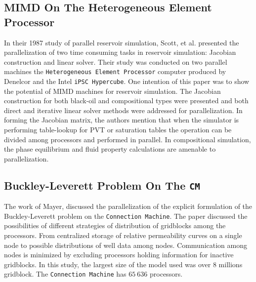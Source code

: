 \documentclass[barcolor=BrickRed,nocopyright,nolists]{asmejour}
\begin{document}
\subsection{MIMD On The Heterogeneous Element Processor}
In their 1987 study of parallel reservoir simulation, Scott, et al.\cite{spe16020} presented the parallelization of two time consuming tasks in reservoir simulation: Jacobian construction and linear solver.
Their study was conducted on two parallel machines the \texttt{Heterogeneous Element Processor} computer produced by Denelcor and the Intel \texttt{iPSC Hypercube}. One intention of this paper was to show
the potential of MIMD machines for reservoir simulation. The Jacobian construction for both black-oil and compositional types were presented and both direct and iterative linear solver methods were addressed 
for parallelization. In forming the Jacobian matrix, the authors mention that when the simulator is performing table-lookup for PVT or saturation tables the operation can be divided among processors and performed
in parallel. In compositional simulation, the phase equilibrium and fluid property calculations are amenable to parallelization.

\subsection{Buckley-Leverett Problem On The \texttt{CM}}
The work of Mayer\cite{spe19121}, discussed the parallelization of the explicit formulation of the Buckley-Leverett problem on the \texttt{Connection Machine}. The paper discussed the possibilities of different strategies
of distribution of gridblocks among the processors. From centralized storage of relative permeability curves on a single node to possible distributions of well data among nodes. Communication among nodes is minimized by excluding processors holding information
for inactive gridblocks. In this study, the largest size of the model used was over $8$ millions gridblock. The \texttt{Connection Machine} has $65 \ 636$ processors.
\end{document}
